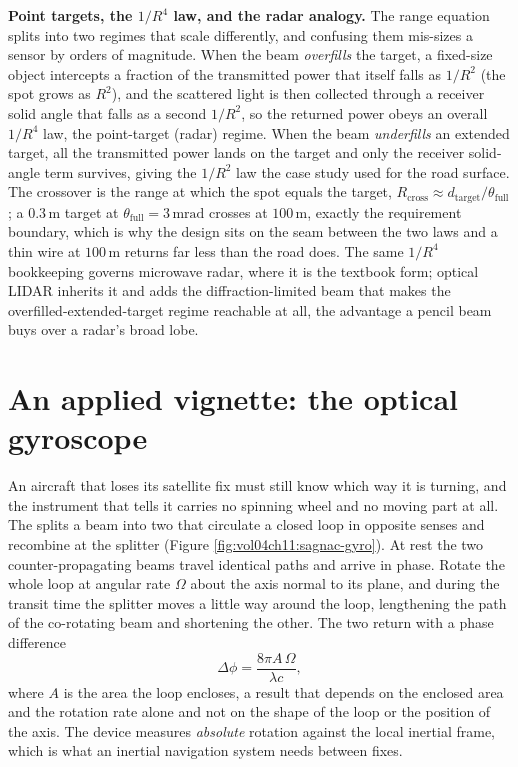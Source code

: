 \begin{mastery}
\textbf{Point targets, the $1/R^{4}$ law, and the radar analogy.} The
range equation splits into two regimes that scale differently, and confusing
them mis-sizes a sensor by orders of magnitude. When the beam \emph{overfills}
the target, a fixed-size object intercepts a fraction of the transmitted power
that itself falls as $1/R^{2}$ (the spot grows as $R^{2}$), and the scattered
light is then collected through a receiver solid angle that falls as a second
$1/R^{2}$, so the returned power obeys an overall $1/R^{4}$ law, the
point-target (radar) regime. When the beam \emph{underfills} an extended
target, all the transmitted power lands on the target and only the receiver
solid-angle term survives, giving the $1/R^{2}$ law the case study used for the
road surface. The crossover is the range at which the spot equals the target,
$R_{\text{cross}}\approx d_{\text{target}}/\theta_{\text{full}}$; a
$0.3\,\si{\meter}$ target at $\theta_{\text{full}}=3\,\si{\milli\radian}$
crosses at $100\,\si{\meter}$, exactly the requirement boundary, which is why
the design sits on the seam between the two laws and a thin wire at
$100\,\si{\meter}$ returns far less than the road does. The same $1/R^{4}$
bookkeeping governs microwave radar, where it is the textbook form; optical
LIDAR inherits it and adds the diffraction-limited beam that makes the
overfilled-extended-target regime reachable at all, the advantage a pencil
beam buys over a radar's broad lobe.
\end{mastery}

\section{An applied vignette: the optical gyroscope}

An aircraft that loses its satellite fix must still know which way it is turning,
and the instrument that tells it carries no spinning wheel and no moving part at
all. The  splits a beam into two that circulate a
closed loop in opposite senses and recombine at the splitter (Figure
\ref{fig:vol04ch11:sagnac-gyro}). At rest the two counter-propagating beams
travel identical paths and arrive in phase. Rotate the whole loop at angular rate
$\Omega$ about the axis normal to its plane, and during the transit time the
splitter moves a little way around the loop, lengthening the path of the
co-rotating beam and shortening the other. The two return with a phase difference
\[
\Delta\phi = \frac{8\pi A\,\Omega}{\lambda c},
\]
where $A$ is the area the loop encloses, a result that depends on the enclosed
area and the rotation rate alone and not on the shape of the loop or the position
of the axis. The device measures \emph{absolute} rotation against the local
inertial frame, which is what an inertial navigation system needs between fixes.

